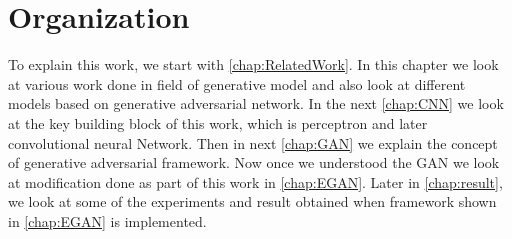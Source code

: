 \section{Organization}

To explain this work, we start with  \autoref{chap:RelatedWork}. In this chapter we look at various work done in field of generative model and also look at different models based on generative adversarial network. In the next \autoref{chap:CNN} we look at the key building block of this work, which is perceptron and later convolutional neural Network. Then in next \autoref{chap:GAN} we explain the concept of generative adversarial framework. Now once we understood the GAN we look at modification done as part of this work in \autoref{chap:EGAN}. Later in \autoref{chap:result}, we look at some of the experiments and result obtained when framework shown in \autoref{chap:EGAN} is implemented.